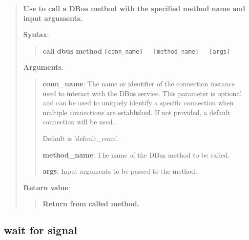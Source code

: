 \begin{quote}
\textbf{Use to call a DBus method with the specified method name and input arguments.}

\textbf{Syntax}:
\begin{quote}
\textbf{call dbus method}
\texttt{{[}conn\_name{]}\ \ \ {[}method\_name{]}\ \ \ {[}args{]}}
\end{quote}

\textbf{Arguments}:

\begin{quote}
\textbf{conn\_name}: The name or identifier of the connection instance used to interact with the DBus service.
  This parameter is optional and can be used to uniquely identify a specific connection
  when multiple connections are established. If not provided, a default connection will be used.

  Default is 'default\_conn'.

\vspace{\baselineskip}

\textbf{method\_name}: The name of the DBus method to be called.

\vspace{\baselineskip}

\textbf{args}: Input arguments to be passed to the method.
\end{quote}

\textbf{Return value}:

\begin{quote}
\textbf{Return from called method.}
\end{quote}
\end{quote}


\hypertarget{description-wait-for-signal}{%
\subsection{\texorpdfstring{\textbf{wait for signal}}{wait for signal}}\label{description-wait-for-signal}}

